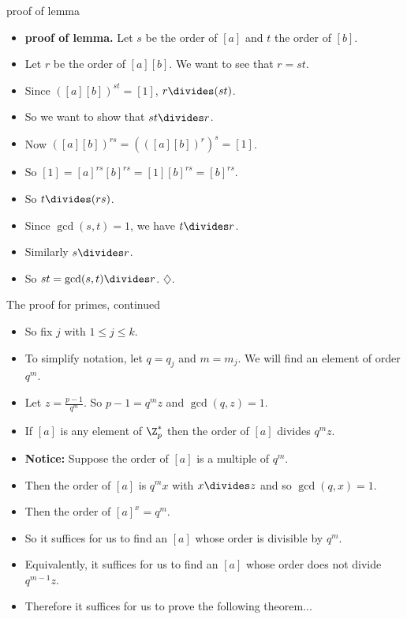\documentclass{beamer}
\begin{document}
\begin{frame}{proof of lemma}

\begin{itemize}
  \item \textbf{proof of lemma.} Let $s$ be the order of $[a]$ and $t$ the order of $[b]$.
  \item Let $r$ be the order of $[a][b]$. We want to see that $r=st$.
  \item Since $([a][b])^{st}=[1]$, $r\divides (st)$.
  \item So we want to show that $st\divides r$.
  \item Now $([a][b])^{rs}= (([a][b])^r)^s = [1]$.
  \item So $[1] = [a]^{rs}[b]^{rs}=[1][b]^{rs} = [b]^{rs}$.
  \item So $t\divides (rs)$.
  \item Since $\gcd(s,t)=1$, we have $t\divides r$.
  \item Similarly $s\divides r$.
  \item So $st=\gcd(s,t) \divides r$. $\diamondsuit$.
\end{itemize}

\end{frame}

\begin{frame}{The proof for primes, continued}

\begin{itemize}
  \item So fix $j$ with $1\leq j \leq k$.
  \item To simplify notation, let $q=q_j$ and $m={m_j}$. We will find an element of order $q^m$.
  \item Let $z=\frac{p-1}{q^m}$. So $p-1 = q^mz$ and $\gcd(q,z)=1$.
  \item If $[a]$ is any element of $\Z_p^*$ then the order of $[a]$ divides $q^mz$.
  \item \textbf{Notice:} Suppose the order of $[a]$ is a multiple of $q^m$.
  \item Then the order of $[a]$ is $q^mx$ with $x\divides z$ and so $\gcd(q,x)=1$.
  \item Then the order of $[a]^x=q^m$.
  \item So it suffices for us to find an $[a]$ whose order is divisible by $q^m$.
  \item Equivalently, it suffices for us to find an $[a]$ whose order does not divide $q^{m-1}z$.
  \item Therefore it suffices for us to prove the following theorem...
\end{itemize}
\end{frame}
\end{document}
